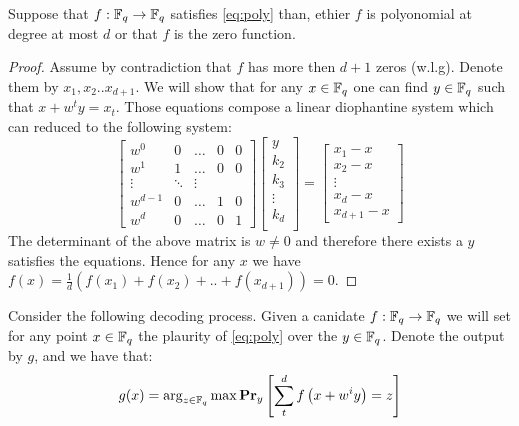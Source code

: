 \begin{claim}
  Suppose that $f : \FF \rightarrow \FF$ satisfies \cref{eq:poly} than, ethier $f$ is polyonomial at degree at most $d$ or that $f$ is the zero function.  
\end{claim}
\begin{proof}
  Assume by contradiction that $f$ has more then $d+1$ zeros (w.l.g). Denote them  by $x_{1},x_{2}.. x_{d+1}$. We will show that for any $x \in \FF $ one can find $y \in \FF$ such that $x + w^{t}y =x_{t}$. Those equations compose a linear diophantine system which can reduced to the following system: 
  \begin{equation*}  
\begin{bmatrix}
  w^{0}                     & 0 &  \dots                   &  0 &     0                 \\
                               w^{1}                & 1     &  \dots             & 0      &       0                    \\
                              \vdots                    &  \ddots               &  \vdots                    \\
                               w^{d-1}              & 0    &  \dots             &   1   &       0                    \\
                               w^{d}              & 0 & \dots       &  0     &       1
\end{bmatrix} 
\begin{bmatrix}
  y \\ 
  k_{2} \\
  k_{3} \\
  \vdots  \\
  k_{d} \\  
\end{bmatrix}
= \begin{bmatrix}
  x_{1} - x \\
  x_{2} -x \\
  \vdots \\
  x_{d} - x \\
  x_{d+1} - x
\end{bmatrix}
  \end{equation*}
  The determinant of the above matrix is $w \neq 0$ and therefore there exists a $y$ satisfies the equations. Hence for any $x$ we have $f(x) = \frac{1}{d}\left( f(x_{1}) + f(x_{2}) + .. + f(x_{d+1}) \right) = 0$.   
\end{proof}

Consider the following decoding process. Given a canidate $f : \FF \rightarrow \FF$ we will set for any point $x \in \FF$ the plaurity of \cref{eq:poly} over the $y \in \FF$. Denote the output by $g$, and we have that:  
\begin{equation*}
  \begin{split}
    g(x) = \arg_{z\in \FF} \max \prbm{ \sum_{t}^{d}{f\left( x + w^{i}y \right) = z }}{y}
  \end{split}
\end{equation*}


